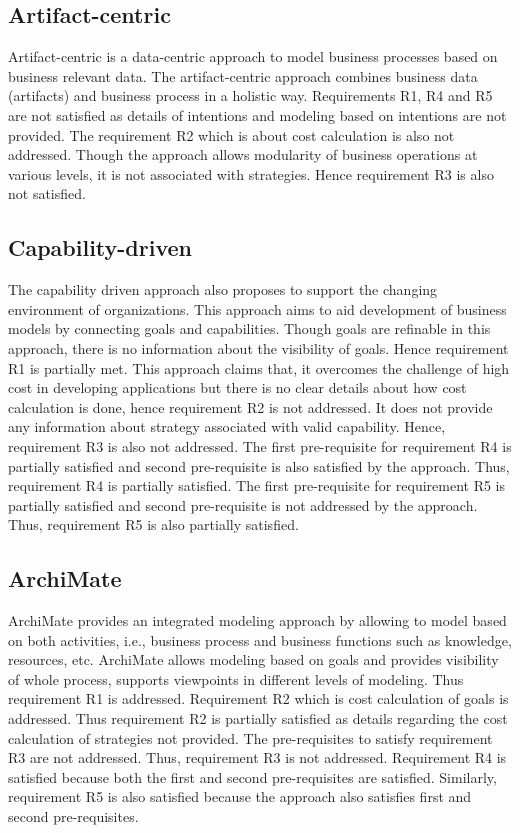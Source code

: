\subsection{Artifact-centric} 
Artifact-centric is a data-centric approach to model business processes based on business relevant data. The artifact-centric approach combines business data (artifacts) and business process in a holistic way. Requirements R1, R4 and R5 are not satisfied as details of intentions and modeling based on intentions are not provided. The requirement R2 which is about cost calculation is also not addressed. Though the approach allows modularity of business operations at various levels, it is not associated with strategies. Hence requirement R3 is also not satisfied. 

\subsection{Capability-driven} 
The capability driven approach also proposes to support the changing environment of organizations. This approach aims to aid development of business models by connecting goals and capabilities. Though goals are refinable in this approach, there is no information about the visibility of goals. Hence requirement R1 is partially met. This approach claims that, it overcomes the challenge of high cost in developing applications but there is no clear details about how cost calculation is done, hence requirement R2 is not addressed. It does not provide any information about strategy associated with valid capability. Hence, requirement R3 is also not addressed. The first pre-requisite for requirement R4 is partially satisfied and second pre-requisite is also satisfied by the approach. Thus, requirement R4 is partially satisfied. The first pre-requisite for requirement R5 is partially satisfied and second pre-requisite is not addressed by the approach. Thus, requirement R5 is also partially satisfied. 

\subsection{ArchiMate}
ArchiMate provides an integrated modeling approach by allowing to model based on both activities, i.e., business process and business functions such as knowledge, resources, etc. ArchiMate allows modeling based on goals and provides visibility of whole process, supports viewpoints in different levels of modeling. Thus requirement R1 is addressed. Requirement R2 which is cost calculation of goals is addressed. Thus requirement R2 is partially satisfied as details regarding the cost calculation of strategies not provided. The pre-requisites to satisfy requirement R3 are not addressed. Thus, requirement R3 is not addressed. Requirement R4 is satisfied because both the first and second pre-requisites are satisfied. Similarly, requirement R5 is also satisfied because the approach also satisfies first and second pre-requisites.  

